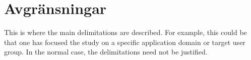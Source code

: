 \section{Avgränsningar}
\label{sec:delimitations}

This is where the main delimitations are described. For
example, this could be that one has focused the study on a
specific application domain or target user group. In the
normal case, the delimitations need not be justified.


